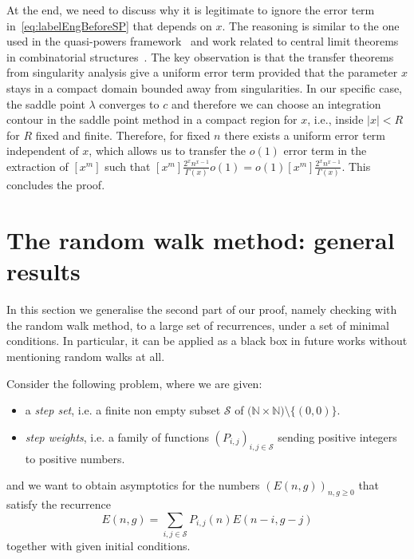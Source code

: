 \documentclass[a4paper,12pt]{article}
\theoremstyle{definition}
\begin{document}
At the end, we need to discuss why it is legitimate to ignore the error term in~\eqref{eq:labelEngBeforeSP} that depends on $x$.
The reasoning is similar to the one used in the quasi-powers framework~\cite{Hwang1998CLT} and work related to central limit theorems in combinatorial structures~\cite{FlajoletSoria1990Gaussian}.
The key observation is that the transfer theorems from singularity analysis give a uniform error term provided that the parameter $x$ stays in a compact domain bounded away from singularities. 
In our specific case, the saddle point $\lambda$ converges to $c$ and therefore we can choose an integration contour in the saddle point method in a compact region for $x$, i.e., inside $|x|<R$ for $R$ fixed and finite.
Therefore, for fixed $n$ there exists a uniform error term independent of $x$, which allows us to transfer the $o(1)$ error term in the extraction of $[x^m]$ such that $[x^m] \frac{2^x n^{x-1}}{\Gamma(x)} o(1) = o(1) [x^m] \frac{2^x n^{x-1}}{\Gamma(x)}$.
This concludes the proof.






\section{The random walk method: general results}\label{sec:RW_general}

In this section we generalise the second part of our proof, namely checking with the random walk method, to a large set of recurrences, under a set of minimal conditions. In particular, it can be applied as a black box in future works without mentioning random walks at all.

Consider the following problem, where we are given:
\begin{itemize}
    \item a \emph{step set}, i.e. a finite non empty subset $\mathcal S$ of $\mathbb (\mathbb N\times\mathbb N)\setminus \{(0,0)\}$.
    \item \emph{step weights}, i.e. a family of functions $(P_{i,j})_{i,j\in\mathcal S}$ sending positive integers to positive numbers.
\end{itemize}
and we want to obtain asymptotics for the numbers  $(E(n,g))_{n,g\geq 0}$ that satisfy the recurrence
\begin{equation}\label{eq_rec_general}
    E(n,g)=\sum_{i,j\in\mathcal{S}} P_{i,j}(n)E(n-i,g-j)
\end{equation}
together with given initial conditions.
\end{document}
